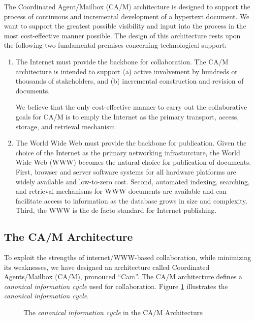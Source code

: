 The Coordinated Agent/Mailbox (CA/M) architecture is designed to support
the process of continuous and incremental development of a hypertext
document.  We want to support the greatest possible visibility and input
into the process in the most cost-effective manner possible.  The design of
this architecture rests upon the following two fundamental premises
concerning technological support:
\begin{enumerate}
\item{The Internet must provide the backbone for collaboration.}
  The CA/M architecture is intended to support (a) active involvement by
  hundreds or thousands of stakeholders, and (b) incremental construction
  and revision of documents.

  We believe that the only cost-effective manner to carry out the
  collaborative goals for CA/M is to emply the Internet as the primary
  transport, access, storage, and retrieval mechanism.

\item{The World Wide Web must provide the backbone for publication.}
  Given the choice of the Internet as the primary networking
  infrasturcture, the World Wide Web (WWW) becomes the natural choice for
  publication of documents.  First, browser and server software systems for
  all hardware platforms are widely available and low-to-zero cost.
  Second, automated indexing, searching, and retrieval mechanisms for WWW
  documents are available and can facilitate access to information as the
  database grows in size and complexity.  Third, the WWW is the de facto
  standard for Internet publishing.
\end{enumerate}

\subsection{The CA/M Architecture}

To exploit the strengths of internet/WWW-based collaboration, while
minimizing its weaknesses, we have designed an architecture called
Coordinated Agents/Mailbox (CA/M), pronouced ``Cam''.  The CA/M
architecture defines a {\em canonical information cycle} used for
collaboration.  Figure \ref{fig:canonical} illustrates the {\em canonical
information cycle}.

\begin{figure}[htb] 
  \centerline{}
  \caption{The {\em canonical information cycle} in the CA/M Architecture}
  \label{fig:canonical}
\end{figure}

